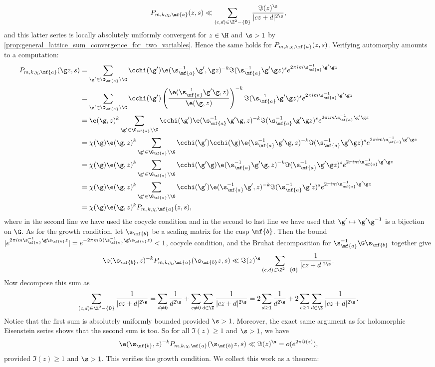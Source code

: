     \[
      P_{m,k,\chi,\mf{a}}(z,s) \ll \sum_{(c,d) \in \Z^{2}-\{\mathbf{0}\}}\frac{\Im(z)^{\s}}{|cz+d|^{2\s}},
    \]
    and this latter series is locally absolutely uniformly convergent for $z \in \H$ and $\s > 1$ by \cref{prop:general_lattice_sum_convergence_for_two_variables}. Hence the same holds for $P_{m,k,\chi,\mf{a}}(z,s)$. Verifying automorphy amounts to a computation:
    \begin{align*}
      P_{m,k,\chi,\mf{a}}(\g z,s) &= \sum_{\g' \in \G_{\mf{a}}\backslash\G}\cchi(\g')\e(\s_{\mf{a}}^{-1}\g',\g z)^{-k}\Im(\s_{\mf{a}}^{-1}\g'\g z)^{s}e^{2\pi im\s_{\mf{a}}^{-1}\g'\g z} \\
      &= \sum_{\g' \in \G_{\mf{a}}\backslash\G}\cchi(\g')\left(\frac{\e(\s_{\mf{a}}^{-1}\g'\g,z)}{\e(\g,z)}\right)^{-k}\Im(\s_{\mf{a}}^{-1}\g'\g z)^{s}e^{2\pi im\s_{\mf{a}}^{-1}\g'\g z} \\
      &= \e(\g,z)^{k}\sum_{\g' \in \G_{\mf{a}}\backslash\G}\cchi(\g')\e(\s_{\mf{a}}^{-1}\g'\g,z)^{-k}\Im(\s_{\mf{a}}^{-1}\g'\g z)^{s}e^{2\pi im\s_{\mf{a}}^{-1}\g'\g z} \\
      &= \chi(\g)\e(\g,z)^{k}\sum_{\g' \in \G_{\mf{a}}\backslash\G}\cchi(\g')\cchi(\g)\e(\s_{\mf{a}}^{-1}\g'\g,z)^{-k}\Im(\s_{\mf{a}}^{-1}\g'\g z)^{s}e^{2\pi im\s_{\mf{a}}^{-1}\g'\g z} \\
      &= \chi(\g)\e(\g,z)^{k}\sum_{\g' \in \G_{\mf{a}}\backslash\G}\cchi(\g'\g)\e(\s_{\mf{a}}^{-1}\g'\g,z)^{-k}\Im(\s_{\mf{a}}^{-1}\g'\g z)^{s}e^{2\pi im\s_{\mf{a}}^{-1}\g'\g z} \\
      &= \chi(\g)\e(\g,z)^{k}\sum_{\g' \in \G_{\mf{a}}\backslash\G}\cchi(\g')\e(\s_{\mf{a}}^{-1}\g',z)^{-k}\Im(\s_{\mf{a}}^{-1}\g' z)^{s}e^{2\pi im\s_{\mf{a}}^{-1}\g'\g z} \\
      &= \chi(\g)\e(\g,z)^{k}P_{m,k,\chi,\mf{a}}(z,s),
    \end{align*}
    where in the second line we have used the cocycle condition and in the second to last line we have used that $\g' \mapsto \g'\g^{-1}$ is a bijection on $\G$. As for the growth condition, let $\s_{\mf{b}}$ be a scaling matrix for the cusp $\mf{b}$. Then the bound $|e^{2\pi im\s_{\mf{a}}^{-1}\g\s_{\mf{b}}z}| = e^{-2\pi m\Im(\s_{\mf{a}}^{-1}\g\s_{\mf{b}}z)} < 1$, cocycle condition, and the Bruhat decomposition for $\s_{\mf{a}}^{-1}\G\s_{\mf{b}}$ together give
    \[
      \e(\s_{\mf{b}},z)^{-k}P_{m,k,\chi,\mf{a}}(\s_{\mf{b}}z,s) \ll \Im(z)^{\s}\sum_{(c,d) \in \Z^{2}-\{\mathbf{0}\}}\frac{1}{|cz+d|^{2\s}}.
    \]
    Now decompose this sum as
    \[
      \sum_{(c,d) \in \Z^{2}-\{\mathbf{0}\}}\frac{1}{|cz+d|^{2\s}} = \sum_{d \neq 0}\frac{1}{d^{2\s}}+\sum_{c \neq 0}\sum_{d \in \Z}\frac{1}{|cz+d|^{2\s}} = 2\sum_{d \ge 1}\frac{1}{d^{2\s}}+2\sum_{c \ge 1}\sum_{d \in \Z}\frac{1}{|cz+d|^{2\s}}.
    \]
    Notice that the first sum is absolutely uniformly bounded provided $\s > 1$. Moreover, the exact same argument as for holomorphic Eisenstein series shows that the second sum is too. So for all $\Im(z) \ge 1$ and $\s > 1$, we have
    \[
      \e(\s_{\mf{b}},z)^{-k}P_{m,k,\chi,\mf{a}}(\s_{\mf{b}}z,s) \ll \Im(z)^{\s} = o(e^{2\pi\Im(z)}),
    \]
    provided $\Im(z) \ge 1$ and $\s > 1$. This verifies the growth condition. We collect this work as a theorem:

